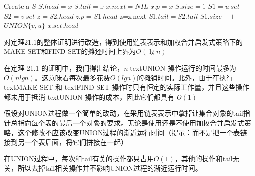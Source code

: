 \documentclass[a4paper, justified]{tufte-handout}
\begin{document}
\begin{solution}
  \begin{algorithm}[H]
    \begin{algorithmic}[1]
      \State Create a $S$
      \State $S.head = x$
      \State $S.tail = x$
      \State $x.next = NIL$
      \State $x.p = x$
      \State $S.size = 1$
      \EndProcedure
      \State $S1 = u.set$
      \State $S2 = v.set$
      \State $z = S2.head$
      \State $z.p = S1.head$
      \State z=z.next
      \EndWhile
      \State $S1.tail = S2.tail$
      \State $S1.size++$
      \EndIf
      \Else
      \State $UNION\{v, u\}$
      \EndIf
      \EndProcedure
      \State \Return $x.set.head$
      \EndFunction
    \end{algorithmic}
  \end{algorithm}



\end{solution}

\begin{problem}[TC 21.2-3]
对定理21.1的整体证明进行改造，得到使用链表表示和加权合并启发式策略下的MAKE-SET和FIND-SET的摊还时间上界为$O(\lg n)$
\end{problem}

\begin{solution}
  在定理 21.1 的证明中，我们得出结论，$n$ text{UNION} 操作运行的时间最多为 $O(n lg n)$。这意味着每次最多花费$O(lg n)$的摊销时间。此外，由于在执行 text{MAKE-SET} 和 text{FIND-SET} 操作时只有恒定的实际工作量，并且这些操作都未用于抵消 text{UNION} 操作的成本，因此它们都具有 $O(1)$
\end{solution}

\begin{problem}[TC 21.2-6]
假设对UNION过程做一个简单的改动，在采用链表表示中拿掉让集合对象的tail指针总指向每个表的最后一个对象的要求。无论是使用还是不使用加权合并启发式策略，这个修改不应该改变UNION过程的渐近运行时间（提示：而不是把一个表链接到另一个表后面，将它们拼接在一起）
\end{problem}

\begin{solution}
  在UNION过程中，每次和tail有关的操作都只占用$O(1)$，其他的操作和tail无关，所以去掉tail相关操作并不影响UNION过程的渐近运行时间。
\end{solution}
\end{document}
